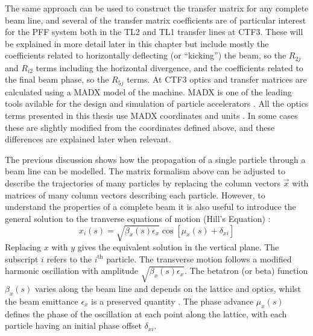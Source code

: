The same approach can be used to construct the transfer matrix for any complete beam line, and several of the transfer matrix coefficients are of particular interest for the PFF system both in the TL2 and TL1 transfer lines at CTF3. These will be explained in more detail later in this chapter but include mostly the coefficients related to horizontally deflecting (or ``kicking'') the beam, so the \(R_{2j}\) and \(R_{i2}\) terms including the horizontal divergence, and the coefficients related to the final beam phase, so the \(R_{5j}\) terms. At CTF3 optics and transfer matrices are calculated using a MADX model of the machine. MADX is one of the leading tools avilable for the design and simulation of particle accelerators \cite{madx}. All the optics terms presented in this thesis use MADX coordinates and units \cite{madx}. In some cases these are slightly modified from the coordinates defined above, and these differences are explained later when relevant.

The previous discussion shows how the propagation of a single particle through a beam line can be modelled. The matrix formalism above can be adjusted to describe the trajectories of many particles by replacing the column vectors \(\vec{x}\) with matrices of many column vectors describing each particle. However, to understand the properties of a complete beam it is also useful to introduce the general solution to the tranverse equations of motion (Hill's Equation) \cite{lee}:
\begin{equation}
x_i(s) = \sqrt{\beta_x(s)\epsilon_x}\cos[\mu_x(s) + \delta_{xi}]
\end{equation}
Replacing \(x\) with \(y\) gives the equivalent solution in the vertical plane. The subscript \(i\) refers to the \(i^\mathrm{th}\) particle. The transverse motion follows a modified harmonic oscillation with amplitude \(\sqrt{\beta_x(s)\epsilon_x}\). The betatron (or beta) function \(\beta_x(s)\) varies along the beam line and depends on the lattice and optics, whilst the beam emittance \(\epsilon_x\) is a preserved quantity \cite{wolski}. The phase advance \(\mu_x(s)\) defines the phase of the oscillation at each point along the lattice, with each particle having an initial phase offset \(\delta_{xi}\).

